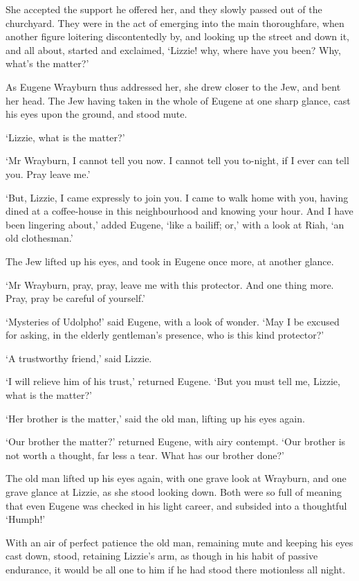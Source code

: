 She accepted the support he offered her, and they slowly passed out
of the churchyard. They were in the act of emerging into the main
thoroughfare, when another figure loitering discontentedly by, and
looking up the street and down it, and all about, started and exclaimed,
‘Lizzie! why, where have you been? Why, what’s the matter?’

As Eugene Wrayburn thus addressed her, she drew closer to the Jew, and
bent her head. The Jew having taken in the whole of Eugene at one sharp
glance, cast his eyes upon the ground, and stood mute.

‘Lizzie, what is the matter?’

‘Mr Wrayburn, I cannot tell you now. I cannot tell you to-night, if I
ever can tell you. Pray leave me.’

‘But, Lizzie, I came expressly to join you. I came to walk home with
you, having dined at a coffee-house in this neighbourhood and knowing
your hour. And I have been lingering about,’ added Eugene, ‘like a
bailiff; or,’ with a look at Riah, ‘an old clothesman.’

The Jew lifted up his eyes, and took in Eugene once more, at another
glance.

‘Mr Wrayburn, pray, pray, leave me with this protector. And one thing
more. Pray, pray be careful of yourself.’

‘Mysteries of Udolpho!’ said Eugene, with a look of wonder. ‘May I be
excused for asking, in the elderly gentleman’s presence, who is this
kind protector?’

‘A trustworthy friend,’ said Lizzie.

‘I will relieve him of his trust,’ returned Eugene. ‘But you must tell
me, Lizzie, what is the matter?’

‘Her brother is the matter,’ said the old man, lifting up his eyes
again.

‘Our brother the matter?’ returned Eugene, with airy contempt. ‘Our
brother is not worth a thought, far less a tear. What has our brother
done?’

The old man lifted up his eyes again, with one grave look at Wrayburn,
and one grave glance at Lizzie, as she stood looking down. Both were so
full of meaning that even Eugene was checked in his light career, and
subsided into a thoughtful ‘Humph!’

With an air of perfect patience the old man, remaining mute and keeping
his eyes cast down, stood, retaining Lizzie’s arm, as though in his
habit of passive endurance, it would be all one to him if he had stood
there motionless all night.

